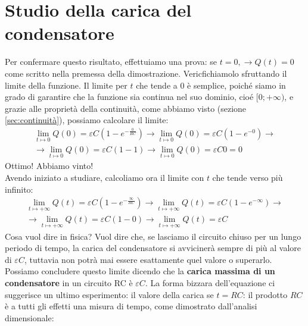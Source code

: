 \documentclass[a3paper, twoside, openany]{book}
\theoremstyle{definition}
\begin{document}
\section{Studio della carica del condensatore}
Per confermare questo risultato, effettuiamo una prova: se $t=0,\longrightarrow Q(t)=0$ come scritto nella premessa della dimostrazione. Vericfichiamolo sfruttando il limite della funzione. Il limite per $t$ che tende a 0 è semplice, poiché siamo in grado di garantire che la funzione sia continua nel suo dominio, cioé $[0;+\infty)$, e grazie alle proprietà della continuità, come abbiamo visto (sezione \ref{sec:continuità}), possiamo calcolare il limite: \begin{multline*}\lim_{t\mapsto 0}Q(0)=\varepsilon C \left(1-e^{-\frac{0}{RC}}\right)\longrightarrow \lim_{t\mapsto 0}Q(0)=\varepsilon C \left(1-e^{-0}\right)\longrightarrow \\\longrightarrow \lim_{t\mapsto 0}Q(0)=\varepsilon C (1-1)\longrightarrow \lim_{t\mapsto 0}Q(0)=\varepsilon C 0=0\end{multline*} Ottimo! Abbiamo vinto! \\ Avendo iniziato a studiare, calcoliamo ora il limite con $t$ che tende verso più infinito: \begin{multline*}\lim_{t\mapsto +\infty}Q(t)=\varepsilon C \left(1-e^{-\frac{\infty}{RC}}\right)\longrightarrow \lim_{t\mapsto +\infty}Q(t)=\varepsilon C \left(1-e^{-\infty}\right)\longrightarrow \\\longrightarrow \lim_{t\mapsto +\infty}Q(t)=\varepsilon C (1-0)\longrightarrow\lim_{t\mapsto +\infty} Q(t)=\varepsilon C\end{multline*} Cosa vuol dire in fisica? Vuol dire che, se lasciamo il circuito chiuso per un lungo periodo di tempo, la carica del condensatore si avvicinerà sempre di più al valore di $\varepsilon C$, tuttavia non potrà mai essere esattamente quel valore o superarlo. Possiamo concludere questo limite dicendo che la \textbf{carica massima di un condensatore} in un circuito RC è $\varepsilon C$. La forma bizzara dell'equazione ci suggerisce un ultimo esperimento: il valore della carica se $t=RC$: il prodotto $RC$ è a tutti gli effetti una misura di tempo, come dimostrato dall'analisi dimensionale:
\end{document}
